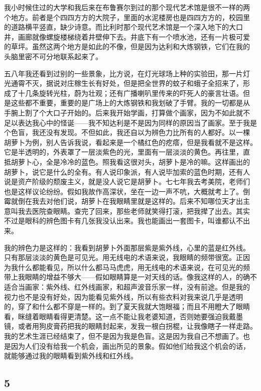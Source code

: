 我小时候住过的大学和我后来在布鲁赛尔到过的那个现代艺术馆是很不一样的两
个地方。前者是个四四方方的大院子，里面的水泥楼房也是四四方方的，校园里
的道路横平竖直，缺少诗意。而比利时那个现代艺术馆是一个深入地下的大口
井，画廊就像螺旋楼梯绕着井壁伸下去。井底下有一个喷水池，还有一片极可爱
的草坪。虽然这两个地方是如此的不像，但是因为达利和大炼钢铁，它们在我的
头脑里密不可分地联系起来了。

五八年我还看到过别的一些景象，比方说，在灯光球场上种的实验田，那一片灯
光通霄不灭，据说对庄稼生长有好处，但是把全世界的蚊子和蛾子全招来了，形
成了十几条旋转光柱，蔚为壮观；还有广播喇叭里传来的吓死人的豪言壮语。但
是这些都不重要，重要的是广场上的大炼钢铁和我划破了手臂。我的一切都是从
手腕上割了个大口子开始的。后来我开始学画，打算做个画家，因为不如此就不
足以表达我心中的怪诞——我不知达利是不是因为同样的原因当了画家。至于我是
个色盲，我还没有发现。不但如此，我还自以为辨色力比所有的人都好。以一棵
胡萝卜为例，别人告诉我说，看起来是一个橘红色的疙瘩，但是我看就不是这样。
它是半透明的，外表罩了一层淡紫色的光，里面有一层淡淡的黄色。再往里，直
抵胡萝卜心，全是冷冷的蓝色。照我看这很对头，胡萝卜是冷的嘛。这样画出的
胡萝卜，说它是什么的全有。有人说印象派，有人说毕加索的蓝色时期，还有人
说是资产阶级的颓废主义，就是没人说它是胡萝卜。七七年我去考美院，老师们
也是这样议论纷纷。假如我故作高深状，坐在一边一声不吭，大概就考上了。倒
霉就倒在我去对他们说，胡萝卜在我眼睛里就是这样的。后来不知哪位天才出主
意叫我去医院查眼睛。查完了回来，那些老师就笑得打滚，把我撵了出去。其实
不过是眼科的辨色图卡有几张我没认出来。我也能画出一套图卡，叫谁都认不出
来。

我的辨色力是这样的：我看到胡萝卜外面那层紫是紫外线，心里的蓝是红外线。
只有那层淡淡的黄色是可见光。用无线电的术语来说，我眼睛的频带很宽。正因
为我什么都能看见，所以什么都马马虎虎，用无线电的术语来说，在可见光的频
带上我眼睛的增益不够大——假如眼睛算是一对天线的话。像我这样的人，的确不
适合当画家：紫外线、红外线画家，和超声波音乐家一样，没有前途。但是我的
视力也不是没有好处，因为能看见紫外线，所以有些衣料对我来说几乎是透明
的，穿了和什么都不穿是一样的。到了夏天我就大饱眼福；而且不用瞪大了眼睛
看，眯缝着眼睛看得更清楚。这一点不能让我老婆知道，否则她要强迫我戴墨
镜，或者用狗皮膏药把我的眼睛封起来，发我一根白拐棍，让我像瞎子一样走路。
我的艺术生涯已经结束了，但不是因为我是色盲。这是因为我自己不想画了。也
是因为人们没有给我一个机会，画出所见的景象。假如他们给我这个机会的话，
就能够通过我的眼睛看到紫外线和红外线。

\subsection{5} 

